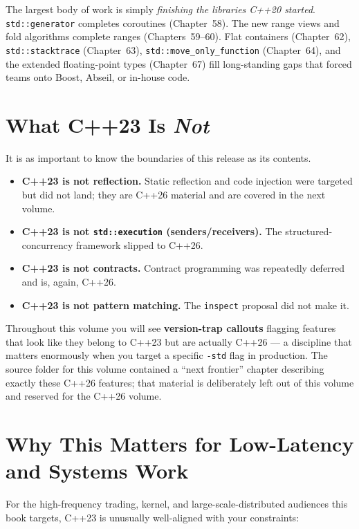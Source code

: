 The largest body of work is simply \emph{finishing the libraries C++20 started}. \lstinline|std::generator| completes coroutines (Chapter~58). The new range views and fold algorithms complete ranges (Chapters~59--60). Flat containers (Chapter~62), \lstinline|std::stacktrace| (Chapter~63), \lstinline|std::move_only_function| (Chapter~64), and the extended floating-point types (Chapter~67) fill long-standing gaps that forced teams onto Boost, Abseil, or in-house code.

\section{What C++23 Is \emph{Not}}

It is as important to know the boundaries of this release as its contents.

\begin{itemize}
    \item \textbf{C++23 is not reflection.} Static reflection and code injection were targeted but did not land; they are C++26 material and are covered in the next volume.
    \item \textbf{C++23 is not \lstinline|std::execution| (senders/receivers).} The structured-concurrency framework slipped to C++26.
    \item \textbf{C++23 is not contracts.} Contract programming was repeatedly deferred and is, again, C++26.
    \item \textbf{C++23 is not pattern matching.} The \lstinline|inspect| proposal did not make it.
\end{itemize}

Throughout this volume you will see \textbf{version-trap callouts} flagging features that look like they belong to C++23 but are actually C++26 --- a discipline that matters enormously when you target a specific \lstinline|-std| flag in production. The source folder for this volume contained a ``next frontier'' chapter describing exactly these C++26 features; that material is deliberately left out of this volume and reserved for the C++26 volume.

\section{Why This Matters for Low-Latency and Systems Work}

For the high-frequency trading, kernel, and large-scale-distributed audiences this book targets, C++23 is unusually well-aligned with your constraints:

